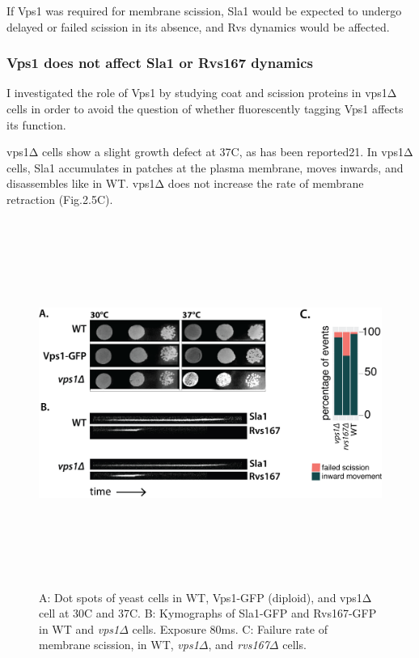 \newpage
If Vps1 was required for membrane scission, Sla1 would be expected to undergo delayed or failed scission in its absence, and Rvs dynamics would be affected. 


	
			\subsubsection{Vps1 does not affect Sla1 or Rvs167 dynamics }
	\vspace{5mm}
I investigated the role of Vps1 by studying coat and scission proteins in vps1Δ cells in order to avoid the question of whether fluorescently tagging Vps1 affects its function. 
\vspace{5mm}

vps1Δ cells show a slight growth defect at 37C, as has been reported21. In vps1Δ cells, Sla1 accumulates in patches at the plasma membrane, moves inwards, and disassembles like in WT. vps1Δ does not increase the rate of membrane retraction (Fig.2.5C). 

	\begin{figure}[H]
	\centering
	\includegraphics[width=12cm,height=12cm,keepaspectratio]{figures/results_final/vps1}
	\caption[Phenotype of \textit{vps1$\Delta$}]
	{A: Dot spots of yeast cells in WT, Vps1-GFP (diploid), and vps1Δ cell at 30C and 37C. 
		B: Kymographs of Sla1-GFP and Rvs167-GFP in WT and \textit{vps1$\Delta$} cells. Exposure 80ms.  
		C: Failure rate of membrane scission, in WT, \textit{vps1$\Delta$}, and \textit{rvs167$\Delta$}  cells. 
		\label{fig4_vpsdel1}}
\end{figure}


